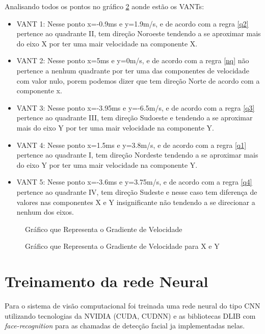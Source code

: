 Analisando todos os pontos no gráfico \ref{fig:teste9} aonde estão os VANTs:

\begin{itemize}
	\item VANT 1: Nesse ponto x=-0.9ms e y=1.9m/s, e de acordo com a regra \ref{q2} pertence ao quadrante II, tem direção Noroeste tendendo a se aproximar mais do eixo X por ter uma mair velocidade na componente X.
	\item VANT 2: Nesse ponto x=5ms e y=0m/s, e de acordo com a regra \ref{nq} não pertence a nenhum quadrante por ter uma das componentes de velocidade com valor nulo, porem podemos dizer que tem direção Norte de acordo com a componente x.
	\item VANT 3: Nesse ponto x=-3.95ms e y=-6.5m/s, e de acordo com a regra \ref{q3} pertence ao quadrante III, tem direção Sudoeste e tendendo a se aproximar mais do eixo Y por ter uma mair velocidade na componente Y.
	\item VANT 4: Nesse ponto x=1.5ms e y=3.8m/s, e de acordo com a regra \ref{q1} pertence ao quadrante I, tem direção Nordeste tendendo a se aproximar mais do eixo Y por ter uma mair velocidade na componente Y.
	\item VANT 5: Nesse ponto x=-3.6ms e y=3.75m/s, e de acordo com a regra \ref{q4} pertence ao quadrante IV, tem direção Sudeste e nesse caso tem diferença de valores nas componentes X e Y insignificante não tendendo a se direcionar a nenhum dos eixos.
\end{itemize}
 

\begin{figure}[H]
	\centering
	\caption{Gráfico que Representa o Gradiente de Velocidade}
	
	\label{fig:teste8}
\end{figure}

\begin{figure}[H]
	\centering
	\caption{Gráfico que Representa o Gradiente de Velocidade para X e Y}
	
	\label{fig:teste9}
\end{figure}

\section{Treinamento da rede Neural}

Para o sistema de visão computacional foi treinada uma rede neural do tipo CNN utilizando tecnologias da NVIDIA (CUDA, CUDNN) e as bibliotecas DLIB com \textit{face-recognition} para as chamadas de detecção facial ja implementadas nelas.


